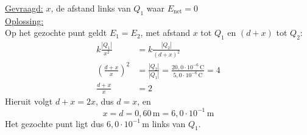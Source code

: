 \documentclass{ximera}
\begin{document}
\begin{exercise}
\begin{question}
\begin{solution}
            \underline{Gevraagd:} $x$, de afstand links van $Q_1$ waar $E_{\text{net}} = 0$\\

            \underline{Oplossing:}\\
            Op het gezochte punt geldt $E_1 = E_2$, met afstand $x$ tot $Q_1$ en $(d+x)$ tot $Q_2$:
            \begin{align*}
                k \frac{|Q_1|}{x^{2}} &= k \frac{|Q_2|}{(d+x)^{2}} \\
                \left(\frac{d+x}{x}\right)^{2} &= \frac{|Q_2|}{|Q_1|} = \frac{20{,}0 \cdot 10^{-6} \, \mathrm{C}}{5{,}0 \cdot 10^{-6} \, \mathrm{C}} = 4 \\
                \frac{d+x}{x} &= 2
            \end{align*}
            Hieruit volgt $d + x = 2x$, dus $d = x$, en
            \[
                x = d = 0{,}60 \, \mathrm{m} = \boxed{6{,}0\cdot 10^{-1} \, \mathrm{m}}
            \]
            Het gezochte punt ligt dus $6{,}0\cdot 10^{-1} \, \mathrm{m}$ links van $Q_1$.
        \end{solution}
    \end{question}
\end{exercise}
\end{document}

